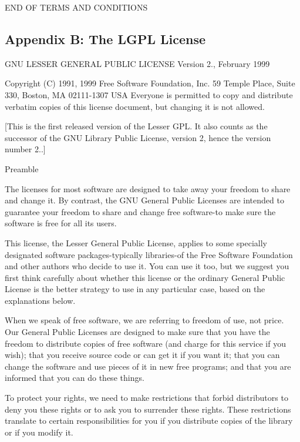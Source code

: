 E\+N\+D O\+F T\+E\+R\+M\+S A\+N\+D C\+O\+N\+D\+I\+T\+I\+O\+N\+S

\subsection*{Appendix B\+: The L\+G\+P\+L License }

G\+N\+U L\+E\+S\+S\+E\+R G\+E\+N\+E\+R\+A\+L P\+U\+B\+L\+I\+C L\+I\+C\+E\+N\+S\+E Version 2., February 1999

Copyright (C) 1991, 1999 Free Software Foundation, Inc. 59 Temple Place, Suite 330, Boston, M\+A 02111-\/1307 U\+S\+A Everyone is permitted to copy and distribute verbatim copies of this license document, but changing it is not allowed.

\mbox{[}This is the first released version of the Lesser G\+P\+L. It also counts as the successor of the G\+N\+U Library Public License, version 2, hence the version number 2..\mbox{]}

Preamble

The licenses for most software are designed to take away your freedom to share and change it. By contrast, the G\+N\+U General Public Licenses are intended to guarantee your freedom to share and change free software-\/to make sure the software is free for all its users.

This license, the Lesser General Public License, applies to some specially designated software packages-\/typically libraries-\/of the Free Software Foundation and other authors who decide to use it. You can use it too, but we suggest you first think carefully about whether this license or the ordinary General Public License is the better strategy to use in any particular case, based on the explanations below.

When we speak of free software, we are referring to freedom of use, not price. Our General Public Licenses are designed to make sure that you have the freedom to distribute copies of free software (and charge for this service if you wish); that you receive source code or can get it if you want it; that you can change the software and use pieces of it in new free programs; and that you are informed that you can do these things.

To protect your rights, we need to make restrictions that forbid distributors to deny you these rights or to ask you to surrender these rights. These restrictions translate to certain responsibilities for you if you distribute copies of the library or if you modify it.

